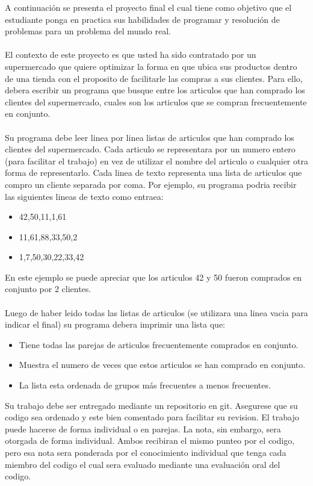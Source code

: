 \documentclass{article}
\begin{document}
A continuaci\'on se presenta el proyecto final el cual tiene como objetivo que el estudiante
ponga en practica sus habilidades de programar y resoluci\'on de problemas para un problema
del mundo real.
\\\\
El contexto de este proyecto es que usted ha sido contratado por un supermercado que quiere
optimizar la forma en que ubica sus productos dentro de una tienda con el proposito de facilitarle
las compras a sus clientes. Para ello, debera escribir un programa que busque entre los articulos
que han comprado los clientes del supermercado, cuales son los articulos que se compran frecuentemente
en conjunto.
\\\\
Su programa debe leer linea por linea listas de articulos que han comprado los clientes del supermercado.
Cada articulo se representara por un numero entero (para facilitar el trabajo) en vez de utilizar el
nombre del articulo o cualquier otra forma de representarlo. Cada linea de texto representa una lista
de articulos que compro un cliente separada por coma. Por ejemplo, su programa podria recibir las
siguientes lineas de texto como entraea:
\begin{itemize}
        \item{42,50,11,1,61}
        \item{11,61,88,33,50,2}
        \item{1,7,50,30,22,33,42}
\end{itemize}
En este ejemplo se puede apreciar que los articulos 42 y 50 fueron comprados en conjunto por
2 clientes.
\\\\
Luego de haber leido todas las listas de articulos (se utilizara una linea vacia para indicar el final)
su programa debera imprimir una lista que:
\begin{itemize}
        \item{Tiene todas las parejas de articulos frecuentemente comprados en conjunto.}
        \item{Muestra el numero de veces que estos articulos se han comprado en conjunto.}
        \item{La lista esta ordenada de grupos m\'as frecuentes a menos frecuentes.}
\end{itemize}

Su trabajo debe ser entregado mediante un repositorio en git. Asegurese que su codigo
sea ordenado y este bien comentado para facilitar su revision. El trabajo puede hacerse
de forma individual o en parejas. La nota, sin embargo, sera otorgada de forma individual.
Ambos recibiran el mismo punteo por el codigo, pero esa nota sera ponderada por el conocimiento
individual que tenga cada miembro del codigo el cual sera evaluado mediante una evaluaci\'on
oral del codigo.
\end{document}
